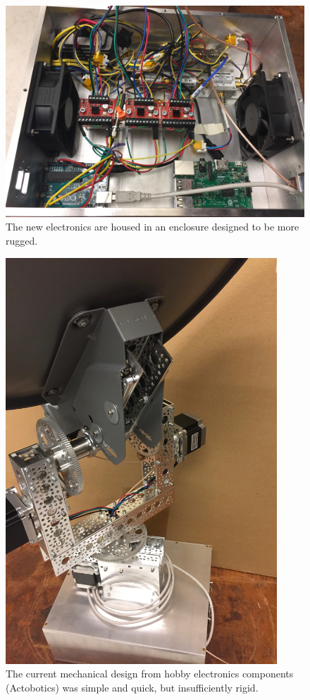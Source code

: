 \documentclass[11pt,letterpaper]{spie}
\begin{document}
\begin{figure}[h]
\centering
\includegraphics[width=6in]{new_electronics.jpeg}
\vspace{5pt}
\caption{The new electronics are housed in an enclosure designed to be more rugged.
}
\label{fig:Devices}
\end{figure}


\begin{figure}[h]
\centering
\includegraphics[height=6in]{new_closeup.jpeg}
\vspace{5pt}
\caption{The current mechanical design from hobby electronics components (Actobotics) was simple and quick, but insufficiently rigid.
}
\label{fig:Devices}
\end{figure}
\end{document}
